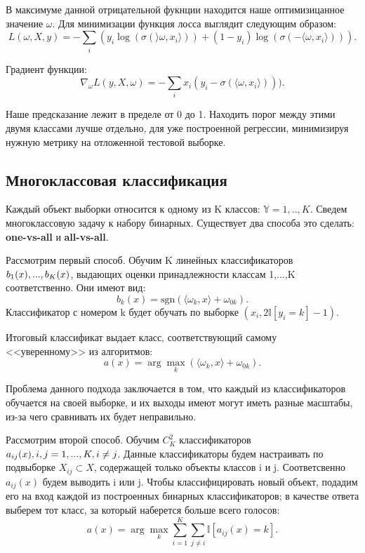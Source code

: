 \documentclass[a4paper, 10pt, openany]{book} %
\begin{document}
	В максимуме данной отрицательной фукнции находится наше оптимизицанное значение $\omega$. Для минимизации функция лосса выглядит следующим образом:
	\begin{equation*}
	    L(\omega, X, y) = -\sum_{i}(y_i \log(\sigma(\rangle\omega,x_i\rangle)) + (1 - y_i)\log(\sigma(-\langle\omega,x_i\rangle))).
	\end{equation*}
	
	Градиент функции:
	\begin{equation*}
	    \nabla_\omega L(y, X, \omega) = - \sum_{i} x_i (y_i - \sigma(\langle\omega,x_i\rangle))).
	\end{equation*}
	
	Наше предсказание лежит в пределе от 0 до 1. Находить порог между этими двумя классами
	лучше отдельно, для уже построенной регрессии, минимизируя нужную метрику на отложенной тестовой выборке.
	
	\subsection{Многоклассовая классификация}
	
	Каждый объект выборки относится к одному из K классов: $\mathbb{Y} = 1,..,K$. Сведем многоклассовую задачу к набору бинарных. Существует два способа это сделать: \textbf{one-vs-all} и \textbf{all-vs-all}.
	
	Рассмотрим первый способ. Обучим K линейных классификаторов $b_1(x),...,\\b_K(x)$, выдающих оценки принадлежности классам 1,...,K соответственно. Они имеют вид:
	    \begin{equation*}
	        b_k(x) = \text{sgn}(\langle\omega_k,x\rangle + \omega_{0k}).
	    \end{equation*}
	 Классификатор с номером k будет обучать по выборке $(x_i,2\mathbb{I}[y_i=k]-1)$. 
	 
	 Итоговый классификат выдает класс, соответствующий самому <<уверенному>> из алгоритмов:
	 \begin{equation*}
	     a(x) = \arg\max_k(\langle\omega_k,x\rangle + \omega_{0k}).
	 \end{equation*}
	 
	 Проблема данного подхода заключается в том, что каждый из классификаторов обучается на своей выборке, и их выходы имеют могут иметь разные масштабы, из-за чего сравнивать их будет неправильно.
	
	Рассмотрим второй способ. Обучим $C^2_K$ классификаторов $a_{ij}(x), i,j = 1,...,K, \\
	i \not=j$. Данные классификаторы будем настраивать по подвыборке $X_{ij} \subset X$, содержащей только объекты классов i и j. Соответсвенно $a_{ij}(x)$ будем выводить i или j. Чтобы классифицировать новый объект, подадим его на вход каждой из построенных бинарных классификаторов; в качестве ответа выберем тот класс, за который наберется больше всего голосов:
	\begin{equation*}
	    a(x) = \arg\max_k\sum_{i=1}^{K}\sum_{j\not=i}\mathbb{I}[a_{ij}(x)=k].
	\end{equation*}
	
\end{document}
